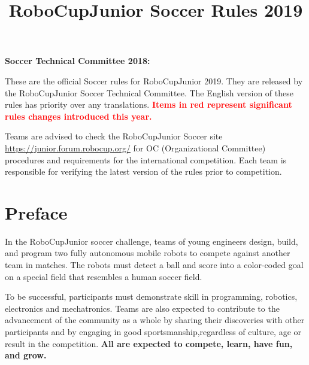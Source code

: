 \documentclass{article}
\title{\vspace{-5ex}RoboCupJunior Soccer Rules 2019\vspace{-5ex}}
\date{\vspace{-2ex}}
\begin{document}
\maketitle
\thispagestyle{firststyle}

\textbf{Soccer Technical Committee 2018:}


These are the official Soccer rules for RoboCupJunior 2019. They are released
by the RoboCupJunior Soccer Technical Committee. The English version of these
rules has priority over any translations. \textcolor{red}{\textbf{Items in red
represent significant rules changes introduced this year.}}

Teams are advised to check the RoboCupJunior Soccer site
\href{https://junior.forum.robocup.org/}{https://junior.forum.robocup.org/}
for OC (Organizational Committee) procedures and requirements for the
international competition. Each team is responsible for verifying the latest version of the
rules prior to competition.

\section*{Preface}

In the RoboCupJunior soccer challenge, teams of young engineers design, build,
and program two fully autonomous mobile robots to compete against another team
in matches. The robots must detect a ball and score into a color-coded goal on
a special field that resembles a human soccer field.

To be successful, participants must demonstrate skill in programming, robotics,
electronics and mechatronics.  Teams are also expected to contribute to the
advancement of the community as a whole by sharing their discoveries with other
participants and by engaging in good sportsmanship,regardless of culture, age or
result in the competition. \textbf{All are expected to compete,
learn, have fun, and grow.}
\end{document}

